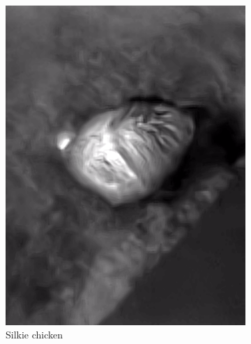 \documentclass{l4proj}
\begin{document}
\begin{figure}[ht]
\begin{subfigure}[h!]{0.18\textwidth}
    \includegraphics[width=\textwidth, trim={0cm 2.5cm 0cm 2.5cm}, clip]{images/dataset/evil_chicken/lwir.png}
    \caption{Silkie chicken}
  \end{subfigure}
  \begin{subfigure}[h!]{0.18\textwidth}

\end{subfigure}
\end{figure}
\end{document}
